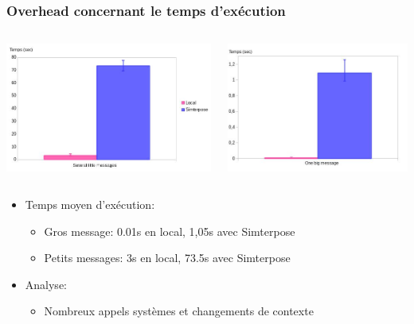 \documentclass[10.5pt]{beamer}
\begin{document}
\begin{frame}{\subsecname}
  \frametitle{Overhead concernant le temps d'exécution}
  \begin{columns}[c]
    \begin{column}{4cm}
      \includegraphics[scale=0.25]{mesures/graph/Littlemsg_local_pres.jpg}
    \end{column}
    \begin{column}{4cm}
      \includegraphics[scale=0.25]{mesures/graph/Bigmsg_local_pres.jpg}
     \end{column}
 \end{columns}

\begin{itemize}
\item Temps moyen d'exécution:
  \begin{itemize}
    \item Gros message: 0.01s en local, 1,05s avec Simterpose
    \item Petits messages: 3s en local, 73.5s avec Simterpose
  \end{itemize}
\item<2-> Analyse:
  \begin{itemize}
  \item<2-> Nombreux appels systèmes et changements de contexte
  \end{itemize}
\end{itemize}
\end{frame}
\end{document}
